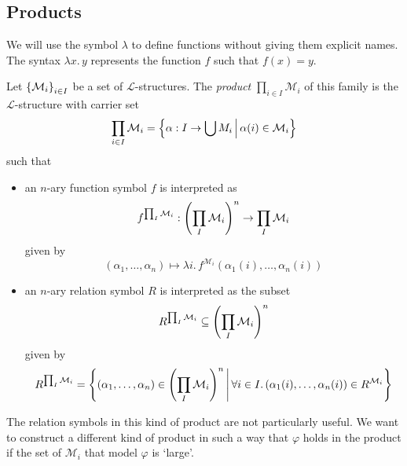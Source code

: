 \subsection{Products}
We will use the symbol \( \lambda \) to define functions without giving them explicit names.
The syntax \( \lambda x.\, y \) represents the function \( f \) such that \( f(x) = y \).

Let \( \qty{\mathcal M_i}_{i \in I} \) be a set of \( \mathcal L \)-structures.
The \emph{product} \( \prod_{i \in I} \mathcal M_i \) of this family is the \( \mathcal L \)-structure with carrier set
\[ \prod_{i \in I} \mathcal M_i = \qty{\alpha : I \to \bigcup M_i \,\middle|\,\alpha(i) \in \mathcal M_i} \]
such that
\begin{itemize}
    \item an \( n \)-ary function symbol \( f \) is interpreted as
    \[ f^{\prod_I \mathcal M_i} : \qty(\prod_I \mathcal M_i)^n \to \prod_I \mathcal M_i \]
    given by
    \[ (\alpha_1, \dots, \alpha_n) \mapsto \lambda i.\, f^{\mathcal M_i}(\alpha_1(i), \dots, \alpha_n(i)) \]
    \item an \( n \)-ary relation symbol \( R \) is interpreted as the subset
    \[ R^{\prod_I \mathcal M_i} \subseteq \qty(\prod_I \mathcal M_i)^n \]
    given by
    \[ R^{\prod_I \mathcal M_i} = \qty{(\alpha_1, \dots, \alpha_n) \in \qty(\prod_I \mathcal M_i)^n \,\middle|\,\forall i \in I.\, (\alpha_1(i), \dots, \alpha_n(i)) \in R^{\mathcal M_i}} \]
\end{itemize}
The relation symbols in this kind of product are not particularly useful.
We want to construct a different kind of product in such a way that \( \varphi \) holds in the product if the set of \( \mathcal M_i \) that model \( \varphi \) is `large'.

